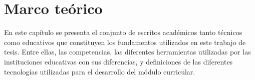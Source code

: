 \chapter{Marco teórico} %
En este capítulo se presenta el conjunto de escritos académicos tanto técnicos como educativos que constituyen los fundamentos utilizados en este trabajo de tesis. Entre ellas, las competencias, las diferentes herramientas utilizadas por las instituciones educativas con sus diferencias, y definiciones de las diferentes tecnologías utilizadas para el desarrollo del módulo curricular.

\label{capitulo2} %










